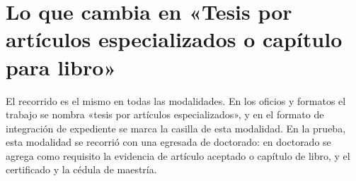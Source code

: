 \section{Lo que cambia en «Tesis por artículos especializados o capítulo para libro»}
El recorrido es el mismo en todas las modalidades. En los oficios y formatos el trabajo se nombra «tesis por artículos especializados», y en el formato de integración de expediente se marca la casilla de esta modalidad.
En la prueba, esta modalidad se recorrió con una egresada de doctorado: en doctorado se agrega como requisito la evidencia de artículo aceptado o capítulo de libro, y el certificado y la cédula de maestría.
